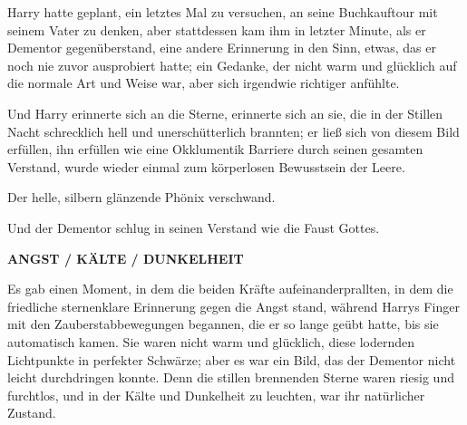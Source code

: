 Harry hatte geplant, ein letztes Mal zu versuchen, an seine Buchkauftour mit seinem Vater zu denken, aber stattdessen kam ihm in letzter Minute, als er Dementor gegenüberstand, eine andere Erinnerung in den Sinn, etwas, das er noch nie zuvor ausprobiert hatte; ein Gedanke, der nicht warm und glücklich auf die normale Art und Weise war, aber sich irgendwie richtiger anfühlte.

Und Harry erinnerte sich an die Sterne, erinnerte sich an sie, die in der Stillen Nacht schrecklich hell und unerschütterlich brannten; er ließ sich von diesem Bild erfüllen, ihn erfüllen wie eine Okklumentik Barriere durch seinen gesamten Verstand, wurde wieder einmal zum körperlosen Bewusstsein der Leere.

Der helle, silbern glänzende Phönix verschwand.

Und der Dementor schlug in seinen Verstand wie die Faust Gottes.

\textbf{ANGST / KÄLTE / DUNKELHEIT}

Es gab einen Moment, in dem die beiden Kräfte aufeinanderprallten, in dem die friedliche sternenklare Erinnerung gegen die Angst stand, während Harrys Finger mit den Zauberstabbewegungen begannen, die er so lange geübt hatte, bis sie automatisch kamen. Sie waren nicht warm und glücklich, diese lodernden Lichtpunkte in perfekter Schwärze; aber es war ein Bild, das der Dementor nicht leicht durchdringen konnte. Denn die stillen brennenden Sterne waren riesig und furchtlos, und in der Kälte und Dunkelheit zu leuchten, war ihr natürlicher Zustand.

